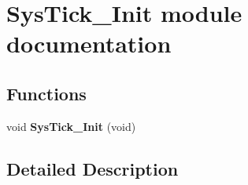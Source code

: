 \hypertarget{group___sys_tick___init__module}{}\section{Sys\+Tick\+\_\+\+Init module documentation}
\label{group___sys_tick___init__module}
\subsection*{Functions}
\begin{DoxyCompactItemize}
\item 
void {\bfseries Sys\+Tick\+\_\+\+Init} (void)\hypertarget{group___sys_tick___init__module_gaeb71ef4b996788e4aa8cda6ef617f58f}{}\label{group___sys_tick___init__module_gaeb71ef4b996788e4aa8cda6ef617f58f}

\end{DoxyCompactItemize}


\subsection{Detailed Description}
